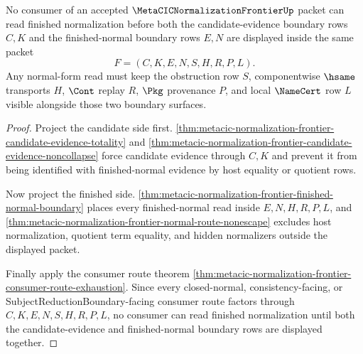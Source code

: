 \begin{theorem}
\label{thm:metacic-normalization-frontier-normal-form-boundary}
No consumer of an accepted $\MetaCICNormalizationFrontierUp$ packet can read finished normalization before both the candidate-evidence boundary rows $C,K$ and the finished-normal boundary rows $E,N$ are displayed inside the same packet
$$
F=(C,K,E,N,S,H,R,P,L).
$$
Any normal-form read must keep the obstruction row $S$, componentwise $\hsame$ transports $H$, $\Cont$ replay $R$, $\Pkg$ provenance $P$, and local $\NameCert$ row $L$ visible alongside those two boundary surfaces.
\end{theorem}
\begin{proof}
Project the candidate side first. \autoref{thm:metacic-normalization-frontier-candidate-evidence-totality} and \autoref{thm:metacic-normalization-frontier-candidate-evidence-noncollapse} force candidate evidence through $C,K$ and prevent it from being identified with finished-normal evidence by host equality or quotient rows.

Now project the finished side. \autoref{thm:metacic-normalization-frontier-finished-normal-boundary} places every finished-normal read inside $E,N,H,R,P,L$, and \autoref{thm:metacic-normalization-frontier-normal-route-nonescape} excludes host normalization, quotient term equality, and hidden normalizers outside the displayed packet.

Finally apply the consumer route theorem \autoref{thm:metacic-normalization-frontier-consumer-route-exhaustion}. Since every closed-normal, consistency-facing, or SubjectReductionBoundary-facing consumer route factors through $C,K,E,N,S,H,R,P,L$, no consumer can read finished normalization until both the candidate-evidence and finished-normal boundary rows are displayed together.
\end{proof}

